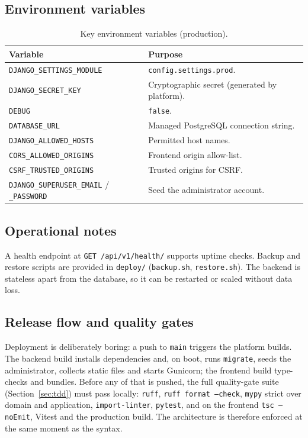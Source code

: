 \documentclass[11pt,a4paper]{article}
\begin{document}
\subsection{Environment variables}

\begin{table}[htbp]\centering
\small
\caption{Key environment variables (production).}
\begin{tabular}{@{}p{}p{}@{}}
\toprule
\textbf{Variable} & \textbf{Purpose} \\
\midrule
\texttt{DJANGO\_SETTINGS\_MODULE} & \texttt{config.settings.prod}. \\
\texttt{DJANGO\_SECRET\_KEY} & Cryptographic secret (generated by platform). \\
\texttt{DEBUG} & \texttt{false}. \\
\texttt{DATABASE\_URL} & Managed PostgreSQL connection string. \\
\texttt{DJANGO\_ALLOWED\_HOSTS} & Permitted host names. \\
\texttt{CORS\_ALLOWED\_ORIGINS} & Frontend origin allow-list. \\
\texttt{CSRF\_TRUSTED\_ORIGINS} & Trusted origins for CSRF. \\
\texttt{DJANGO\_SUPERUSER\_EMAIL} / \texttt{\_PASSWORD} & Seed the administrator account. \\
\bottomrule
\end{tabular}
\end{table}

\subsection{Operational notes}

A health endpoint at \texttt{GET /api/v1/health/} supports uptime checks. Backup and restore scripts
are provided in \texttt{deploy/} (\texttt{backup.sh}, \texttt{restore.sh}). The backend is stateless
apart from the database, so it can be restarted or scaled without data loss.

\subsection{Release flow and quality gates}

Deployment is deliberately boring: a push to \texttt{main} triggers the platform builds. The backend
build installs dependencies and, on boot, runs \texttt{migrate}, seeds the administrator, collects
static files and starts Gunicorn; the frontend build type-checks and bundles. Before any of that is
pushed, the full quality-gate suite (Section~\ref{sec:tdd}) must pass locally: \texttt{ruff},
\texttt{ruff format --check}, \texttt{mypy} strict over domain and application,
\texttt{import-linter}, \texttt{pytest}, and on the frontend \texttt{tsc --noEmit}, Vitest and the
production build. The architecture is therefore enforced at the same moment as the syntax.
\end{document}
